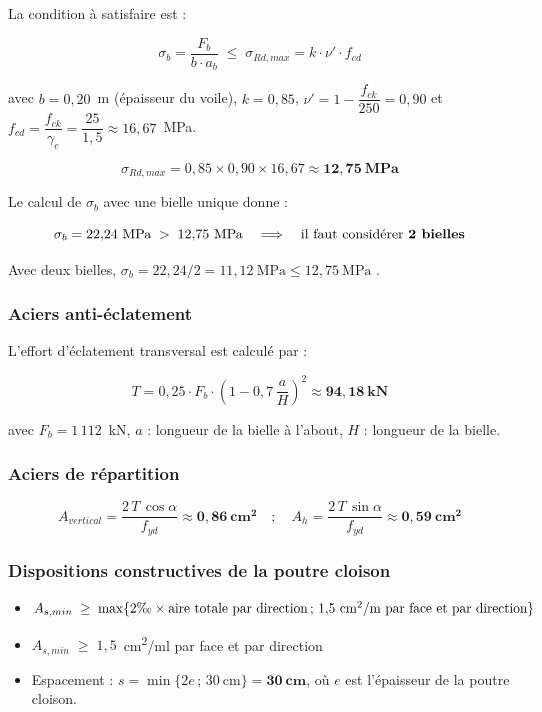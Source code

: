 La condition à satisfaire est :

\[
\sigma_b = \frac{F_b}{b \cdot a_b} \;\leq\; \sigma_{Rd,max} = k \cdot \nu' \cdot f_{cd}
\]

avec $b = 0{,}20$~m (épaisseur du voile), $k = 0{,}85$, $\nu' = 1 - \dfrac{f_{ck}}{250} = 0{,}90$ et $f_{cd} = \dfrac{f_{ck}}{\gamma_c} = \dfrac{25}{1{,}5} \approx 16{,}67$~MPa.

\[
\sigma_{Rd,max} = 0{,}85 \times 0{,}90 \times 16{,}67 \approx \mathbf{12{,}75~\text{MPa}}
\]

Le calcul de $\sigma_b$ avec une bielle unique donne :

\[
\sigma_b = 22{,}24~\text{MPa} \;>\; 12{,}75~\text{MPa}
\quad\Longrightarrow\quad
\text{il faut considérer \textbf{2 bielles}}
\]

Avec deux bielles, $\sigma_b = 22{,}24 / 2 = 11{,}12~\text{MPa} \leq 12{,}75~\text{MPa}$ .

\subsubsection{Aciers anti-éclatement}

L'effort d'éclatement transversal est calculé par :

\[
T = 0{,}25 \cdot F_b \cdot \left(1 - 0{,}7 \, \frac{a}{H}\right)^2 \approx \mathbf{94{,}18~\text{kN}}
\]

avec $F_b = 1\,112$~kN, $a$ : longueur de la bielle à l'about, $H$ : longueur de la bielle.

\subsubsection{Aciers de répartition}

\[
A_{vertical} = \frac{2 \, T \, \cos \alpha}{f_{yd}} \approx \mathbf{0{,}86~\text{cm}^2}
\quad ; \quad
A_h = \frac{2 \, T \, \sin \alpha}{f_{yd}} \approx \mathbf{0{,}59~\text{cm}^2}
\]

\subsubsection{Dispositions constructives de la poutre cloison}

\begin{itemize}
  \item $A_{s,min} \;\geq\; \max\{2\text{\textperthousand} \times \text{aire totale par direction} \,;\, 1{,}5~\text{cm}^2/\text{m par face et par direction}\}$
  \item $A_{s,min} \;\geq\; 1{,}5$~cm\textsuperscript{2}/ml par face et par direction
  \item Espacement : $s = \min\{2e \,;\, 30~\text{cm}\} = \mathbf{30~\text{cm}}$, où $e$ est l'épaisseur de la poutre cloison.
\end{itemize}

